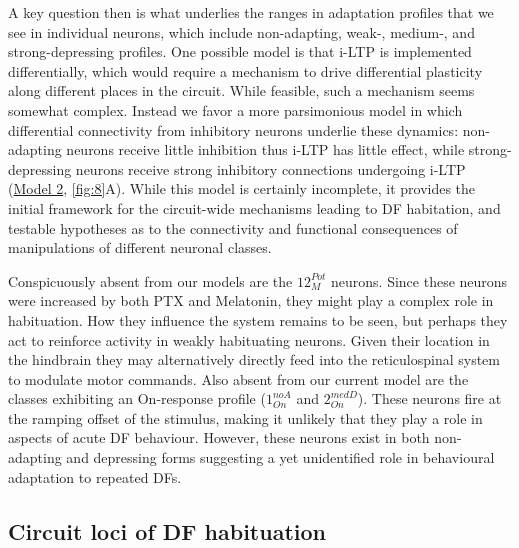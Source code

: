 \documentclass[9pt,lineno]{RandlettLab_elife}
\begin{document}
A key question then is what underlies the ranges in adaptation profiles that we see in individual neurons, which include non-adapting, weak-, medium-, and strong-depressing profiles. One possible model is that i-LTP is implemented differentially, which would require a mechanism to drive differential plasticity along different places in the circuit. While feasible, such a mechanism seems somewhat complex. Instead we favor a more parsimonious model in which differential connectivity from inhibitory neurons underlie these dynamics: non-adapting neurons receive little inhibition thus i-LTP has little effect, while strong-depressing neurons receive strong inhibitory connections undergoing i-LTP (\underline{Model 2}, \autoref{fig:8}A). While this  model is certainly incomplete, it provides the initial framework for the circuit-wide mechanisms leading to DF habitation, and testable hypotheses as to the connectivity and functional consequences of manipulations of different neuronal classes.

Conspicuously absent from our models are the $12_{M}^{Pot}$ neurons. Since these neurons were increased by both PTX and Melatonin, they might play a complex role in habituation. How they influence the system remains to be seen, but perhaps they act to reinforce activity in weakly habituating neurons. Given their location in the  hindbrain they may alternatively directly feed into the reticulospinal system to modulate motor commands. Also absent from our current model are the classes exhibiting an On-response profile ($1_{On}^{noA}$ and $2_{On}^{medD}$). These neurons fire at the ramping offset of the stimulus, making it unlikely that they play a role in aspects of acute DF behaviour. However, these neurons exist in both non-adapting and depressing forms suggesting a yet unidentified role in behavioural adaptation to repeated DFs. 

\subsection{Circuit loci of DF habituation}
\end{document}

